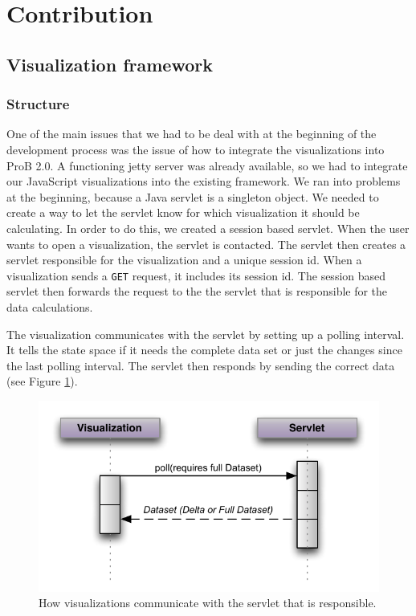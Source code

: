 \section{Contribution}

\subsection{Visualization framework}

\subsubsection{Structure}

One of the main issues that we had to be deal with at the beginning of the development process was the issue of how to integrate the visualizations into ProB 2.0. A functioning jetty server was already available, so we had to integrate our JavaScript visualizations into the existing framework. We ran into problems at the beginning, because a Java servlet is a singleton object. We needed to create a way to let the servlet know for which visualization it should be calculating. In order to do this, we created a session based servlet. When the user wants to open a visualization, the servlet is contacted. The servlet then creates a servlet responsible for the visualization and a unique session id. When a visualization sends a \texttt{GET} request, it includes its session id. The session based servlet then forwards the request to the the servlet that is responsible for the data calculations.

The visualization communicates with the servlet by setting up a polling interval. It tells the state space if it needs the complete data set or just the changes since the last polling interval. The servlet then responds by sending the correct data (see Figure \ref{communication}).

\begin{center}
\begin{figure}[h!]
\centering
\includegraphics[width=14cm]{bilder/communication.pdf}
\caption{How visualizations communicate with the servlet that is responsible.}
\label{communication}
\end{figure}
\end{center}

